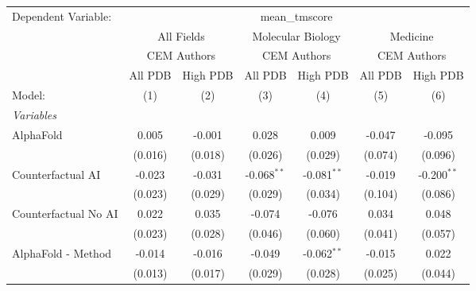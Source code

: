 \begingroup
\centering
\begin{tabular}{lcccccc}
   \tabularnewline \midrule \midrule
   Dependent Variable: & \multicolumn{6}{c}{mean\_tmscore}\\
 & \multicolumn{2}{c}{All Fields} & \multicolumn{2}{c}{Molecular Biology} & \multicolumn{2}{c}{Medicine} \\
\cmidrule(lr){2-3} \cmidrule(lr){4-5} \cmidrule(lr){6-7}
 & \multicolumn{2}{c}{CEM Authors} & \multicolumn{2}{c}{CEM Authors} & \multicolumn{2}{c}{CEM Authors} \\
\cmidrule(lr){2-3} \cmidrule(lr){4-5} \cmidrule(lr){6-7}
 & \multicolumn{1}{c}{All PDB} & \multicolumn{1}{c}{High PDB} & \multicolumn{1}{c}{All PDB} & \multicolumn{1}{c}{High PDB} & \multicolumn{1}{c}{All PDB} & \multicolumn{1}{c}{High PDB} \\
\cmidrule(lr){2-2} \cmidrule(lr){3-3} \cmidrule(lr){4-4} \cmidrule(lr){5-5} \cmidrule(lr){6-6} \cmidrule(lr){7-7}
   Model:                                                     & (1)     & (2)     & (3)           & (4)           & (5)     & (6)\\  
   \midrule
   \emph{Variables}\\
   AlphaFold                                                  & 0.005   & -0.001  & 0.028         & 0.009         & -0.047  & -0.095\\   
                                                              & (0.016) & (0.018) & (0.026)       & (0.029)       & (0.074) & (0.096)\\   
   Counterfactual AI                                          & -0.023  & -0.031  & -0.068$^{**}$ & -0.081$^{**}$ & -0.019  & -0.200$^{**}$\\   
                                                              & (0.023) & (0.029) & (0.029)       & (0.034)       & (0.104) & (0.086)\\   
   Counterfactual No AI                                       & 0.022   & 0.035   & -0.074        & -0.076        & 0.034   & 0.048\\   
                                                              & (0.023) & (0.028) & (0.046)       & (0.060)       & (0.041) & (0.057)\\   
   AlphaFold - Method                                         & -0.014  & -0.016  & -0.049        & -0.062$^{**}$ & -0.015  & 0.022\\   
                                                              & (0.013) & (0.017) & (0.029)       & (0.028)       & (0.025) & (0.044)\\   

\end{tabular}
